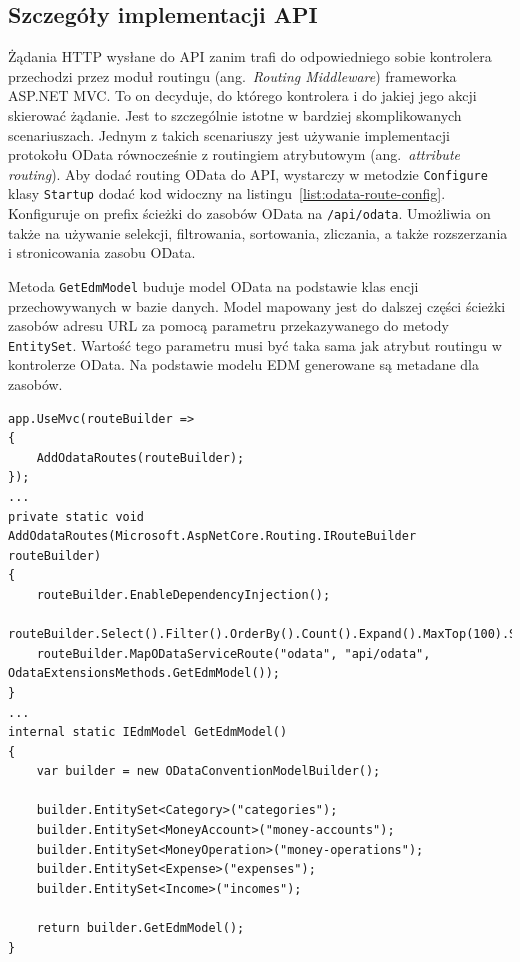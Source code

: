 \subsection{Szczegóły implementacji API}
\label{subsec:szczegoly-implementacji-api}

Żądania HTTP wysłane do API zanim trafi do odpowiedniego sobie kontrolera przechodzi przez moduł routingu (ang.~\emph{Routing Middleware}) frameworka ASP.NET MVC. To on decyduje, do którego kontrolera i do jakiej jego akcji skierować żądanie. Jest to szczególnie istotne w bardziej skomplikowanych scenariuszach. Jednym z takich scenariuszy jest używanie implementacji protokołu OData równocześnie z routingiem atrybutowym (ang.~\emph{attribute routing}). Aby dodać routing OData do API, wystarczy w metodzie \texttt{Configure} klasy \texttt{Startup} dodać kod widoczny na listingu~\ref{list:odata-route-config}. Konfiguruje on prefix ścieżki do zasobów OData na \texttt{/api/odata}. Umożliwia on także na używanie selekcji, filtrowania, sortowania, zliczania, a także rozszerzania i stronicowania zasobu OData. 

Metoda \texttt{GetEdmModel} buduje model OData na podstawie klas encji przechowywanych w bazie danych. Model mapowany jest do dalszej części ścieżki zasobów adresu URL za pomocą parametru przekazywanego do metody \texttt{EntitySet}. Wartość tego parametru musi być taka sama jak atrybut routingu w kontrolerze OData. Na podstawie modelu EDM generowane są metadane dla zasobów. 

{\belowcaptionskip=-10pt
\begin{lstlisting}[label=list:odata-route-config,
    caption=Konfiguracja rouingu OData w aplikacji MVC]
app.UseMvc(routeBuilder =>
{
    AddOdataRoutes(routeBuilder);
});
...
private static void AddOdataRoutes(Microsoft.AspNetCore.Routing.IRouteBuilder routeBuilder)
{
    routeBuilder.EnableDependencyInjection();
    routeBuilder.Select().Filter().OrderBy().Count().Expand().MaxTop(100).SkipToken();
    routeBuilder.MapODataServiceRoute("odata", "api/odata", OdataExtensionsMethods.GetEdmModel());
}
...
internal static IEdmModel GetEdmModel()
{
    var builder = new ODataConventionModelBuilder();

    builder.EntitySet<Category>("categories");
    builder.EntitySet<MoneyAccount>("money-accounts");
    builder.EntitySet<MoneyOperation>("money-operations");
    builder.EntitySet<Expense>("expenses");
    builder.EntitySet<Income>("incomes");

    return builder.GetEdmModel();
}
\end{lstlisting}
}


